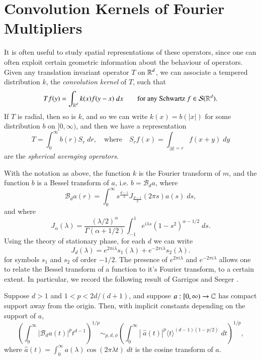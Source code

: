 \section{Convolution Kernels of Fourier Multipliers}

It is often useful to study spatial representations of these operators, since one can often exploit certain geometric information about the behaviour of operators. Given any translation invariant operator $T$ on $\operatorname{\mathbb{R}}^d$, we can associate a tempered distribution $k$, the \emph{convolution kernel} of $T$, such that
%
\[ Tf(y) = \int_{\operatorname{\mathbb{R}}^d} k(x) f(y-x)\; dx \quad\quad\text{for any Schwartz $f \in \mathcal{S}(\operatorname{\mathbb{R}}^d)$}. \]
%
If $T$ is radial, then so is $k$, and so we can write $k(x) = b(|x|)$ for some distribution $b$ on $[0,\infty)$, and then we have a representation
%
\[ T = \int_0^\infty b(r) S_r\; dr,\quad\text{where}\quad S_rf(x) = \int_{|y| = r} f(x + y)\; dy \]
%
are the \emph{spherical averaging operators}.

With the notation as above, the function $k$ is the Fourier transform of $m$, and the function $b$ is a Bessel transform of $a$, i.e. $b = \mathcal{B}_d a$, where
%
\[ \mathcal{B}_d a(r) = \int_0^\infty s^{\frac{d-1}{2}} J_{\frac{d-1}{2}}(2 \pi s) a(s)\; ds, \]
%
%
and where
%
\[ J_\alpha(\lambda) = \frac{(\lambda / 2)^\alpha}{\Gamma(\alpha + 1/2)} \int_{-1}^1 e^{i \lambda s} (1 - s^2)^{\alpha - 1/2}\; ds. \]
%
Using the theory of stationary phase, for each $d$ we can write
%
\[ J_d(\lambda) = e^{2 \pi i \lambda} s_1(\lambda) + e^{-2 \pi i \lambda} s_2(\lambda). \]
%
for symbols $s_1$ and $s_2$ of order $-1/2$. The presence of $e^{2 \pi i \lambda}$ and $e^{-2 \pi i \lambda}$ allows one to relate the Bessel transform of a function to it's Fourier transform, to a certain extent. In particular, we record the following result of Garrigos and Seeger \cite{GarrigosandSeeger}.

\begin{theorem} \label{GarrigosSeegerTheorem}
    Suppose $d > 1$ and $1 < p < 2d/(d+1)$, and suppose $a: [0,\infty) \to \operatorname{\mathbb{C}}$ has compact support away from the origin. Then, with implicit constants depending on the support of $a$,
    \[ \left( \int_0^\infty |\mathcal{B}_d a (t)|^p t^{d-1} \right)^{1/p} \sim_{p,d,\phi} \left( \int_0^\infty |\;\!\widehat{a}(t)|^p \langle t \rangle^{(d-1)(1 - p/2)}\; dt \right)^{1/p}, \]
    where $\widehat{a}(t) = \int_0^\infty a(\lambda) \cos(2 \pi \lambda t)\; dt$ is the cosine transform of $a$.
\end{theorem}

